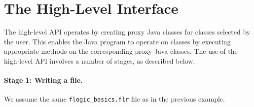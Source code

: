 \section{The High-Level Interface}

The high-level API operates by creating proxy Java classes for 
\FLORA classes selected by the user.
This enables the Java program to operate on \FLORA classes by
executing appropriate methods on the corresponding proxy Java classes.
The use of the high-level API involves a number of stages, as described below.

\paragraph{Stage 1: Writing a \FLORA file.}
We assume the same {\tt flogic\_basics.flr} file as in the previous
example.

